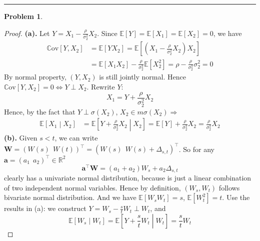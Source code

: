 \documentclass[a4paper, 10pt]{article}
\theoremstyle{definition}
\newtheorem{problem}{Problem}
\theoremstyle{hSol}
\begin{document}
\noindent\rule{16cm}{0.4pt}
\begin{problem}
\end{problem}
\begin{proof} \textbf{(a).} Let $Y=X_1 - \frac{\rho}{\sigma_2^2} X_2$. Since $\mathbb{E}\left[Y\right] = \mathbb{E}\left[X_1\right] = \mathbb{E}\left[X_2\right] = 0$, we have
\begin{equation}
	\begin{split}
		\mathrm{\mathbb{C}ov}\left[Y, X_2\right] &= \mathbb{E}\left[YX_2\right] = \mathbb{E}\left[\left(X_1 - \frac{\rho}{\sigma_2^2} X_2\right)X_2\right] \\
		&= \mathbb{E}\left[X_1X_2\right] - \frac{\rho}{\sigma_2^2} \mathbb{E}\left[X_2^2\right] = \rho - \frac{\rho}{\sigma_2^2}\sigma_2^2 = 0
	\end{split}
\end{equation}
By normal property, $(Y,X_2)$ is still jointly normal. Hence $\mathrm{\mathbb{C}ov}\left[Y,X_2\right] = 0 \iff Y\perp X_2$. Rewrite $Y$:
$$
X_1 = Y + \frac{\rho}{\sigma^2_2} X_2
$$
Hence, by the fact that $Y\perp \sigma(X_2)$, $X_2 \in m \sigma(X_2) \Rightarrow$
\begin{equation}
	\begin{split}
		\mathbb{E}\left[X_1\middle| X_2\right] &=  \mathbb{E}\left[ Y + \frac{\rho}{\sigma^2_2} X_2\middle|X_2\right] = \mathbb{E}\left[Y\right] + \frac{\rho}{\sigma^2_2} X_2 = \frac{\rho}{\sigma^2_2} X_2
	\end{split}
\end{equation}
\textbf{(b).} Given $s<t$, we can write $\bm{W} = (W(s)~~W(t))^{\top} = (W(s)~~W(s)+\Delta_{s,t})^{\top}$. So for any $\bm{a}=(a_1~~a_2)^{\top} \in \mathbb{R}^2$
\begin{equation}
	\bm{a}^{\top} \bm{W} = (a_1 + a_2)W_s + a_2 \Delta_{s,t}
\end{equation}
clearly has a univariate normal distribution, because is just a linear combination of two independent normal variables. Hence by definition, $(W_s, W_t)$ follows bivariate normal distribution. And we have $\mathbb{E}\left[W_sW_t\right] = s$, $\mathbb{E}\left[W_t^2\right] = t$. Use the results in (a): we construct $Y=W_s - \frac{s}{t}W_t \perp W_t$, and
\begin{equation}
	\mathbb{E}\left[W_s\middle|W_t\right] = \mathbb{E}\left[Y+\frac{s}{t}W_t\middle|W_t\right] = \frac{s}{t}W_t
\end{equation}
\end{proof}
\end{document}
